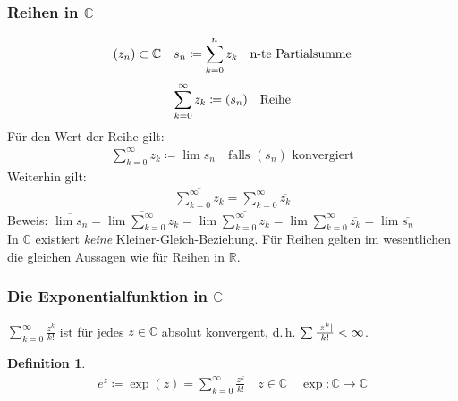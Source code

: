 \documentclass[ngerman,titlepage,twoside, parskip=half*]{scrreprt}
\newcommand*{\R}{\mathbb{R}}
\newcommand*{\C}{\mathbb{C}}
\theoremstyle{break}
\newtheorem{definition}{Definition}[chapter]
\theoremstyle{nonumberbreak}
\DeclarePairedDelimiter{\abs}{\lvert}{\rvert}
\begin{document}
\subsubsection{Reihen in $\C$}
\begin{gather*}(z_n)\subset \C\quad s_n\coloneqq\sum_{k=0}^n z_k \quad \text{n-te Partialsumme\index{Partialsumme}}\end{gather*}
\begin{gather*}\sum_{k=0}^{\infty} z_k\coloneqq(s_n) \quad \text{Reihe\index{Reihe}}\end{gather*}
Für den Wert der Reihe gilt:
\begin{gather*}\sum_{k=0}^{\infty} z_k\coloneqq\lim s_n \quad \text{falls }(s_n) \text{ konvergiert}\end{gather*}
Weiterhin gilt:
\begin{gather*}\overline{\sum_{k=0}^{\infty} z_k}=\sum_{k=0}^\infty \overline{z_k}\end{gather*}
Beweis: $\overline{\lim s_n}=\overline{\lim\sum_{k=0}^\infty z_k}=\lim \overline{\sum_{k=0}^\infty
z_k}=\lim \sum_{k=0}^\infty \overline{z_k}=\lim \overline{s_n}$\\
In $\C$ existiert \emph{keine} Kleiner-Gleich-Beziehung. Für Reihen gelten im wesentlichen die
gleichen Aussagen wie für Reihen in $\R$.

\subsubsection{Die Exponentialfunktion in $\C$}

$\sum_{k=0}^\infty \frac{z^k}{k!}$ ist für jedes $z\in\C$ absolut konvergent, d.\,h. $\sum \frac{\abs{z^k}}{k!}
<\infty$.
\begin{definition}
\begin{gather*}e^z\coloneqq\exp(z)=\sum_{k=0}^\infty \frac{z^k}{k!}\quad z\in\C\quad\exp\colon\C\rightarrow\C\end{gather*}
\end{definition}
\end{document}

